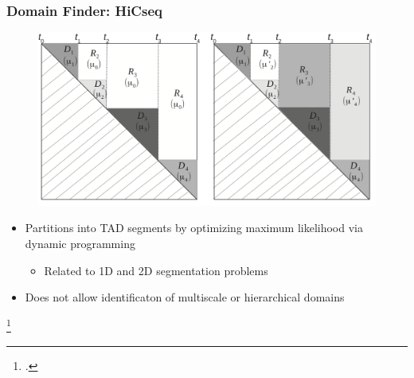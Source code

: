 \documentclass[12pt]{beamer}
\begin{document}
\begin{frame}
\frametitle{Domain Finder: HiCseq}

\begin{figure}
\includegraphics[scale=0.5]{leduc.png}
\end{figure}

\begin{itemize}
\item Partitions into TAD segments by optimizing maximum likelihood
  via dynamic programming
\begin{itemize}
\item Related to 1D and 2D segmentation problems
\end{itemize}
\vspace{0.1cm}
\item Does not allow identificaton of multiscale or
  hierarchical domains
\end{itemize}

\footcitetext{levy2014}

\end{frame}
\end{document}
